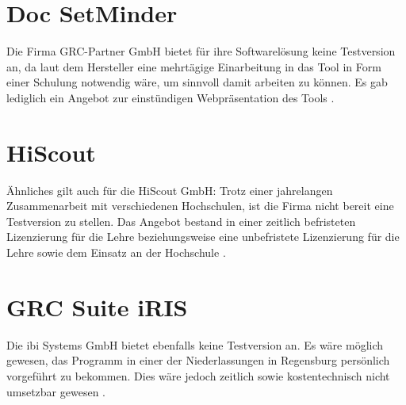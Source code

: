 \section{Doc SetMinder}
Die Firma GRC-Partner GmbH bietet für ihre Softwarelösung keine Testversion an, da laut dem Hersteller eine mehrtägige Einarbeitung in das Tool in Form einer Schulung notwendig wäre, um sinnvoll damit arbeiten zu können. Es gab lediglich ein Angebot zur einstündigen Webpräsentation des Tools \cite{docsetminder}. 

\section{HiScout}
Ähnliches gilt auch für die HiScout GmbH: Trotz einer jahrelangen Zusammenarbeit mit verschiedenen Hochschulen, ist die Firma nicht bereit eine Testversion zu stellen. Das Angebot bestand in einer zeitlich befristeten Lizenzierung für die Lehre beziehungsweise eine unbefristete Lizenzierung für die Lehre sowie dem Einsatz an der Hochschule \cite{hiscout}.

\section{GRC Suite iRIS}
Die ibi Systems GmbH bietet ebenfalls keine Testversion an. Es wäre möglich gewesen, das Programm in einer der Niederlassungen in Regensburg persönlich vorgeführt zu bekommen. Dies wäre jedoch zeitlich sowie kostentechnisch nicht umsetzbar gewesen \cite{grcsuite}.

